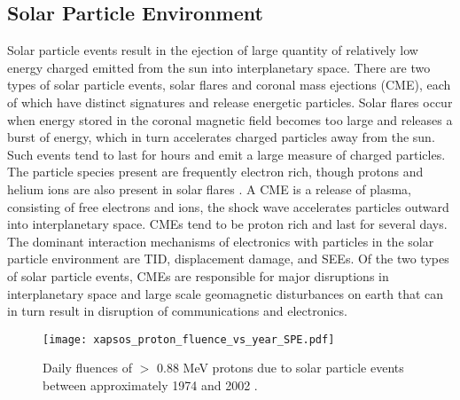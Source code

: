 \subsection{Solar Particle Environment} %
\label{sub:solar_wind}
Solar particle events result in the ejection of large quantity of relatively low energy charged emitted from the sun into interplanetary space.
There are two types of solar particle events, solar flares and coronal mass ejections (CME), each of which have distinct signatures and release energetic particles.
Solar flares occur when energy stored in the coronal magnetic field becomes too large and releases a burst of energy, which in turn accelerates charged particles away from the sun.
Such events tend to last for hours and emit a large measure of charged particles.
The particle species present are frequently electron rich, though protons and helium ions are also present in solar flares \cite{xapsos:2006}.
A CME is a release of plasma, consisting of free electrons and ions, the shock wave accelerates particles outward into interplanetary space.
CMEs tend to be proton rich and last for several days.
The dominant interaction mechanisms of electronics with particles in the solar particle environment are TID, displacement damage, and SEEs.
Of the two types of solar particle events, CMEs are responsible for major disruptions in interplanetary space and large scale geomagnetic disturbances on earth that can in turn result in disruption of communications and electronics.

\begin{figure}[htbp]
    \begin{center}
        \texttt{[image: xapsos\_proton\_fluence\_vs\_year\_SPE.pdf]}
    \end{center}
    \caption[Daily fluences of $>$ 0.88 MeV protons due to solar particle events between approximately 1974 and 2002.]{Daily fluences of $>$ 0.88 MeV protons due to solar particle events between approximately 1974 and 2002 \cite{xapsos:2006}.}
    \label{fig:proton_fluence_vs_year}
\end{figure}

